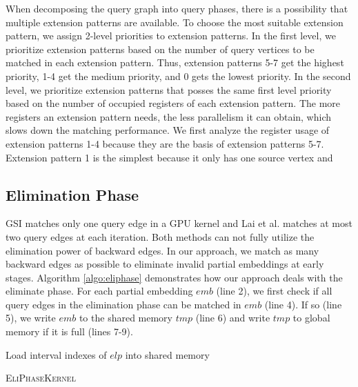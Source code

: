 When decomposing the query graph into query phases, there is a possibility that multiple extension patterns are available. To choose the most suitable extension pattern, we assign 2-level priorities to extension patterns. In the first level, we prioritize extension patterns based on the number of query vertices to be matched in each extension pattern. Thus, extension patterns 5-7 get the highest priority, 1-4 get the medium priority, and 0 gets the lowest priority. In the second level, we prioritize extension patterns that posses the same first level priority based on the number of occupied registers of each extension pattern. The more registers an extension pattern needs, the less parallelism it can obtain, which slows down the matching performance. We first analyze the register usage of extension patterns 1-4 because they are the basis of extension patterns 5-7. Extension pattern 1 is the simplest because it only has one source vertex and 

\subsection{Elimination Phase} \label{sec:eliphase}
GSI \cite{zeng2020gsi} matches only one query edge in a GPU kernel and Lai et al. \cite{lai2015scalable} matches at most two query edges at each iteration. Both methods can not fully utilize the elimination power of backward edges. In our approach, we match as many backward edges as possible to eliminate invalid partial embeddings at early stages. Algorithm \ref{algo:eliphase} demonstrates how our approach deals with the eliminate phase. For each partial embedding $emb$ (line 2), we first check if all query edges in the elimination phase can be matched in $emb$ (line 4). If so (line 5), we write $emb$ to the shared memory $tmp$ (line 6) and write $tmp$ to global memory if it is full (lines 7-9).
\begin{algorithm}
Load interval indexes of $elp$ into shared memory\;
\caption{\textsc{EliPhaseKernel}}
\label{algo:eliphase}
\end{algorithm}



